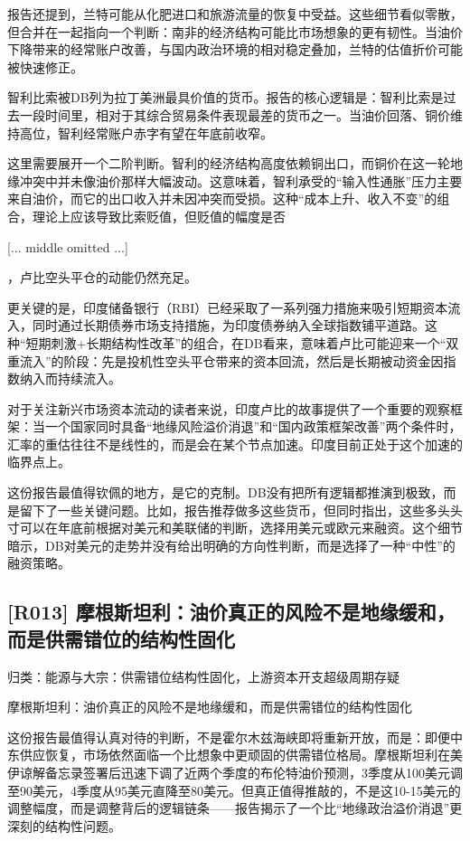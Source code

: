 \documentclass[11pt]{ctexart}
\begin{document}
报告还提到，兰特可能从化肥进口和旅游流量的恢复中受益。这些细节看似零散，但合并在一起指向一个判断：南非的经济结构可能比市场想象的更有韧性。当油价下降带来的经常账户改善，与国内政治环境的相对稳定叠加，兰特的估值折价可能被快速修正。

智利比索被DB列为拉丁美洲最具价值的货币。报告的核心逻辑是：智利比索是过去一段时间里，相对于其综合贸易条件表现最差的货币之一。当油价回落、铜价维持高位，智利经常账户赤字有望在年底前收窄。

这里需要展开一个二阶判断。智利的经济结构高度依赖铜出口，而铜价在这一轮地缘冲突中并未像油价那样大幅波动。这意味着，智利承受的“输入性通胀”压力主要来自油价，而它的出口收入并未因冲突而受损。这种“成本上升、收入不变”的组合，理论上应该导致比索贬值，但贬值的幅度是否

[... middle omitted ...]

，卢比空头平仓的动能仍然充足。

更关键的是，印度储备银行（RBI）已经采取了一系列强力措施来吸引短期资本流入，同时通过长期债券市场支持措施，为印度债券纳入全球指数铺平道路。这种“短期刺激+长期结构性改革”的组合，在DB看来，意味着卢比可能迎来一个“双重流入”的阶段：先是投机性空头平仓带来的资本回流，然后是长期被动资金因指数纳入而持续流入。

对于关注新兴市场资本流动的读者来说，印度卢比的故事提供了一个重要的观察框架：当一个国家同时具备“地缘风险溢价消退”和“国内政策框架改善”两个条件时，汇率的重估往往不是线性的，而是会在某个节点加速。印度目前正处于这个加速的临界点上。

这份报告最值得钦佩的地方，是它的克制。DB没有把所有逻辑都推演到极致，而是留下了一些关键问题。比如，报告推荐做多这些货币，但同时指出，这些多头头寸可以在年底前根据对美元和美联储的判断，选择用美元或欧元来融资。这个细节暗示，DB对美元的走势并没有给出明确的方向性判断，而是选择了一种“中性”的融资策略。

\subsection{[R013] 摩根斯坦利：油价真正的风险不是地缘缓和，而是供需错位的结构性固化}
{\small\color{refgray}归类：能源与大宗：供需错位结构性固化，上游资本开支超级周期存疑}

摩根斯坦利：油价真正的风险不是地缘缓和，而是供需错位的结构性固化

这份报告最值得认真对待的判断，不是霍尔木兹海峡即将重新开放，而是：即便中东供应恢复，市场依然面临一个比想象中更顽固的供需错位格局。摩根斯坦利在美伊谅解备忘录签署后迅速下调了近两个季度的布伦特油价预测，3季度从100美元调至90美元，4季度从95美元直降至80美元。但真正值得推敲的，不是这10-15美元的调整幅度，而是调整背后的逻辑链条——报告揭示了一个比“地缘政治溢价消退”更深刻的结构性问题。
\end{document}
